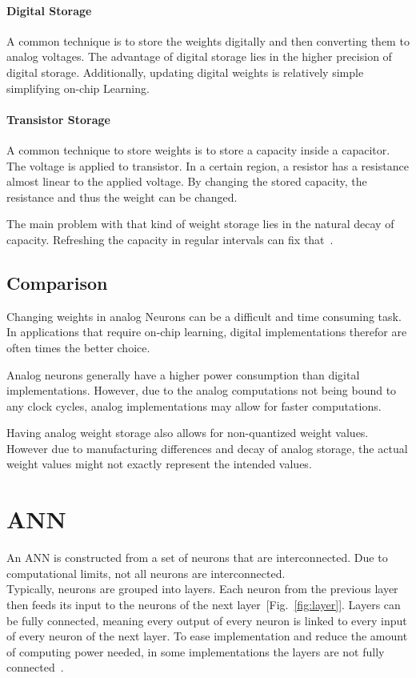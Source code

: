 \documentclass[conference]{IEEEtran}
\begin{document}
    \paragraph{Digital Storage}
    A common technique is to store the weights digitally and then converting them to analog voltages.
    The advantage of digital storage lies in the higher precision of digital storage.
    Additionally, updating digital weights is relatively simple simplifying on-chip Learning.

    \paragraph{Transistor Storage}
    A common technique to store weights is to store a capacity inside a capacitor.
    The voltage is applied to transistor.
    In a certain region, a resistor has a resistance almost linear to the applied voltage.
    By changing the stored capacity, the resistance and thus the weight can be changed.

    The main problem with that kind of weight storage lies in the natural decay of capacity.
    Refreshing the capacity in regular intervals can fix that~\cite{reed1989multiple}.

    \subsection{Comparison}

    Changing weights in analog Neurons can be a difficult and time consuming task.
    In applications that require on-chip learning, digital implementations therefor are often times the better choice.

    Analog neurons generally have a higher power consumption than digital implementations.
    However, due to the analog computations not being bound to any clock cycles, analog implementations may allow for faster computations.

    Having analog weight storage also allows for non-quantized weight values.
    However due to manufacturing differences and decay of analog storage, the actual weight values might not exactly represent the intended values.

    \section{ANN}


    An ANN is constructed from a set of neurons that are interconnected.
    Due to computational limits, not all neurons are interconnected. \\
    Typically, neurons are grouped into layers.
    Each neuron from the previous layer then feeds its input to the neurons of the next layer~[Fig.~\ref{fig:layer}].
    Layers can be fully connected, meaning every output of every neuron is linked to every input of every neuron of the next layer.
    To ease implementation and reduce the amount of computing power needed, in some implementations the layers are not fully connected~\cite{boser1991analog}.
\end{document}

